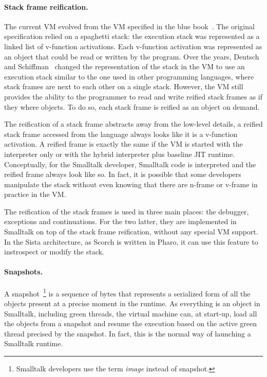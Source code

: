 \documentclass[a4paper,12pt,twoside]{../includes/ThesisStyle}
\begin{document}
\paragraph{Stack frame reification.}

The current VM evolved from the VM specified in the blue book~\cite{Gold83a}. The original specification relied on a spaghetti stack: the execution stack was represented as a linked list of v-function activations. Each v-function activation was represented as an object that could be read or written by the program. Over the years, Deutsch and Schiffman~\cite{Deut84a} changed the representation of the stack in the VM to use an execution stack similar to the one used in other programming languages, where stack frames are next to each other on a single stack. However, the VM still provides the ability to the programmer to read and write reified stack frames as if they where objects. To do so, each stack frame is reified as an object on demand. 

The reification of a stack frame abstracts away from the low-level details, a reified stack frame accessed from the language always looks like it is a v-function activation. A reified frame is exactly the same if the VM is started with the interpreter only or with the hybrid interpreter plus baseline JIT runtime. Conceptually, for the Smalltalk developer, Smalltalk code is interpreted and the reified frame always look like so. In fact, it is possible that some developers manipulate the stack without even knowing that there are n-frame or v-frame in practice in the VM.

The reification of the stack frames is used in three main places: the debugger, exceptions and continuations. For the two latter, they are implemented in Smalltalk on top of the stack frame reification, without any special VM support. In the Sista architecture, as Scorch is written in Pharo, it can use this feature to instrospect or modify the stack.

\paragraph{Snapshots.}

A snapshot~\footnote{Smalltalk developers use the term \emph{image} instead of snapshot.} is a sequence of bytes that represents a serialized form of all the objects present at a precise moment in the runtime. As everything is an object in Smalltalk, including green threads, the virtual machine can, at start-up, load all the objects from a snapshot and resume the execution based on the active green thread precised by the snapshot. In fact, this is the normal way of launching a Smalltalk runtime. 
\end{document}
